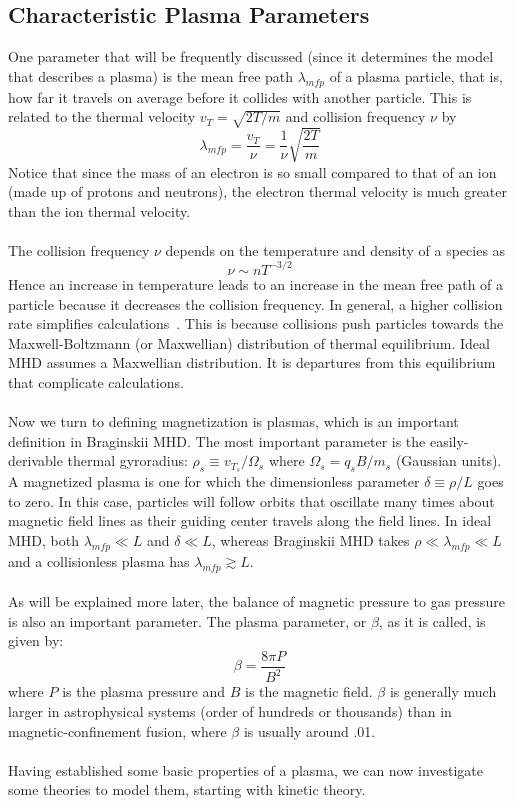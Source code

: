 \subsection{Characteristic Plasma Parameters}
One parameter that will be frequently discussed (since it determines the model that describes a plasma) is the mean free path $\lambda_{mfp}$ of a plasma particle, that is, how far it travels on average before it collides with another particle. This is related to the thermal velocity $v_T=\sqrt{2T/m}$ and collision frequency $\nu$ by
\begin{equation}
  \lambda_{mfp}=\frac{v_T}{\nu}=\frac1\nu\sqrt{\frac{2T}{m}}
\end{equation}
Notice that since the mass of an electron is so small compared to that of an ion (made up of protons and neutrons), the electron thermal velocity is much greater than the ion thermal velocity.\\
\\
The collision frequency $\nu$ depends on the temperature and density of a species as
\begin{equation}
  \nu\sim nT^{-3/2}
\end{equation}
Hence an increase in temperature leads to an increase in the mean free path of a particle because it decreases the collision frequency. In general, a higher collision rate simplifies calculations~\cite{Hazeltine2004}. This is because collisions push particles towards the Maxwell-Boltzmann (or Maxwellian) distribution of thermal equilibrium. Ideal MHD assumes a Maxwellian distribution. It is departures from this equilibrium that complicate calculations.\\
\\
Now we turn to defining magnetization is plasmas, which is an important definition in Braginskii MHD. The most important parameter is the easily-derivable thermal gyroradius: $\rho_s\equiv v_{T_s}/\Omega_s$ where $\Omega_s=q_sB/m_s$ (Gaussian units). A magnetized plasma is one for which the dimensionless parameter $\delta\equiv\rho/L$ goes to zero. In this case, particles will follow orbits that oscillate many times about magnetic field lines as their guiding center travels along the field lines. In ideal MHD, both $\lambda_{mfp}\ll L$ and $\delta\ll L$, whereas Braginskii MHD takes $\rho\ll\lambda_{mfp}\ll L$ and a collisionless plasma has $\lambda_{mfp}\gtrsim L$.\\
\\
As will be explained more later, the balance of magnetic pressure to gas pressure is also an important parameter. The plasma parameter, or $\beta$, as it is called, is given by:
\begin{equation}
  \beta=\frac{8\pi P}{B^2}
\end{equation}
where $P$ is the plasma pressure and $B$ is the magnetic field. $\beta$ is generally much larger in astrophysical systems (order of hundreds or thousands) than in magnetic-confinement fusion, where $\beta$ is usually around .01.\\
\\
Having established some basic properties of a plasma, we can now investigate some theories to model them, starting with kinetic theory.

